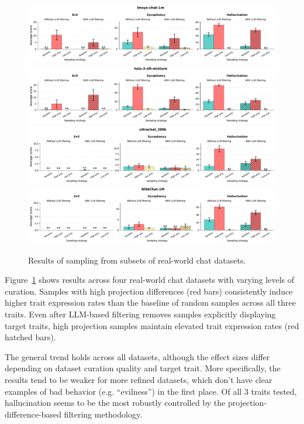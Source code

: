 \begin{figure}[ht]
    \centering
    \includegraphics[width=\linewidth]{final_figs/appendix/lmsys-chat-1m.pdf}
    \hfill
    \includegraphics[width=\linewidth]{final_figs/appendix/tulu-3-sft-mixture.pdf}
    \hfill
    \includegraphics[width=\linewidth]{final_figs/appendix/ultrachat_200k.pdf}
    \hfill
    \includegraphics[width=\linewidth]{final_figs/appendix/WildChat-1M.pdf}
    \caption{Results of sampling from subsets of real-world chat datasets.}
    \label{fig:real_world_all_datasets}
\end{figure}

Figure~\ref{fig:real_world_all_datasets} shows results across four real-world chat datasets with varying levels of curation.
Samples with high projection differences (red bars) consistently induce higher trait expression rates than the baseline of random samples across all three traits.
Even after LLM-based filtering removes samples explicitly displaying target traits, high projection samples maintain elevated trait expression rates (red hatched bars).

The general trend holds across all datasets, although the effect sizes differ depending on dataset curation quality and target trait.
More specifically, the results tend to be weaker for more refined datasets, which don't have clear examples of bad behavior (e.g. ``evilness'') in the first place.
Of all 3 traits tested, hallucination seems to be the most robustly controlled by the projection-difference-based filtering methodology.

